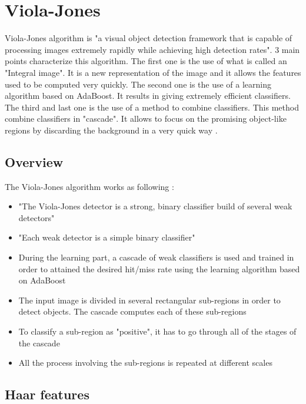 \chapter{Viola-Jones}
\label{chap:vj}

\noindent Viola-Jones algorithm is "a visual object detection framework that is capable of processing images extremely rapidly while achieving high detection rates". 3 main points characterize this algorithm. The first one is the use of what is called an "Integral image". It is a new representation of the image and it allows the features used to be computed very quickly. The second one is the use of a learning algorithm based on AdaBoost. It results in giving extremely efficient classifiers. The third and last one is the use of a method to combine classifiers. This method combine classifiers in "cascade". It allows to focus on the promising object-like regions by discarding the background in a very quick way \cite{VIO01}.
\newline

\section{Overview}

\vspace{\baselineskip}
\noindent The Viola-Jones algorithm works as following \cite{DIN08}:

\begin{itemize}
  \item "The Viola-Jones detector is a strong, binary classifier build of several weak detectors"
  \item "Each weak detector is a simple binary classifier"
  \item During the learning part, a cascade of weak classifiers is used and trained in order to attained the desired hit/miss rate using the learning algorithm based on AdaBoost
  \item The input image is divided in several rectangular sub-regions in order to detect objects. The cascade computes each of these sub-regions
  \item To classify a sub-region as "positive", it has to go through all of the stages of the cascade
  \item All the process involving the sub-regions is repeated at different scales
\end{itemize}

\section{Haar features}

